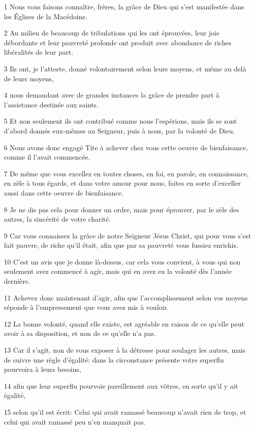 \par 1 Nous vous faisons connaître, frères, la grâce de Dieu qui s'est manifestée dans les Églises de la Macédoine.
\par 2 Au milieu de beaucoup de tribulations qui les ont éprouvées, leur joie débordante et leur pauvreté profonde ont produit avec abondance de riches libéralités de leur part.
\par 3 Ils ont, je l'atteste, donné volontairement selon leurs moyens, et même au delà de leurs moyens,
\par 4 nous demandant avec de grandes instances la grâce de prendre part à l'assistance destinée aux saints.
\par 5 Et non seulement ils ont contribué comme nous l'espérions, mais ils se sont d'abord donnés eux-mêmes au Seigneur, puis à nous, par la volonté de Dieu.
\par 6 Nous avons donc engagé Tite à achever chez vous cette oeuvre de bienfaisance, comme il l'avait commencée.
\par 7 De même que vous excellez en toutes choses, en foi, en parole, en connaissance, en zèle à tous égards, et dans votre amour pour nous, faites en sorte d'exceller aussi dans cette oeuvre de bienfaisance.
\par 8 Je ne dis pas cela pour donner un ordre, mais pour éprouver, par le zèle des autres, la sincérité de votre charité.
\par 9 Car vous connaissez la grâce de notre Seigneur Jésus Christ, qui pour vous s'est fait pauvre, de riche qu'il était, afin que par sa pauvreté vous fussiez enrichis.
\par 10 C'est un avis que je donne là-dessus, car cela vous convient, à vous qui non seulement avez commencé à agir, mais qui en avez eu la volonté dès l'année dernière.
\par 11 Achevez donc maintenant d'agir, afin que l'accomplissement selon vos moyens réponde à l'empressement que vous avez mis à vouloir.
\par 12 La bonne volonté, quand elle existe, est agréable en raison de ce qu'elle peut avoir à sa disposition, et non de ce qu'elle n'a pas.
\par 13 Car il s'agit, non de vous exposer à la détresse pour soulager les autres, mais de suivre une règle d'égalité: dans la circonstance présente votre superflu pourvoira à leurs besoins,
\par 14 afin que leur superflu pourvoie pareillement aux vôtres, en sorte qu'il y ait égalité,
\par 15 selon qu'il est écrit: Celui qui avait ramassé beaucoup n'avait rien de trop, et celui qui avait ramassé peu n'en manquait pas.
